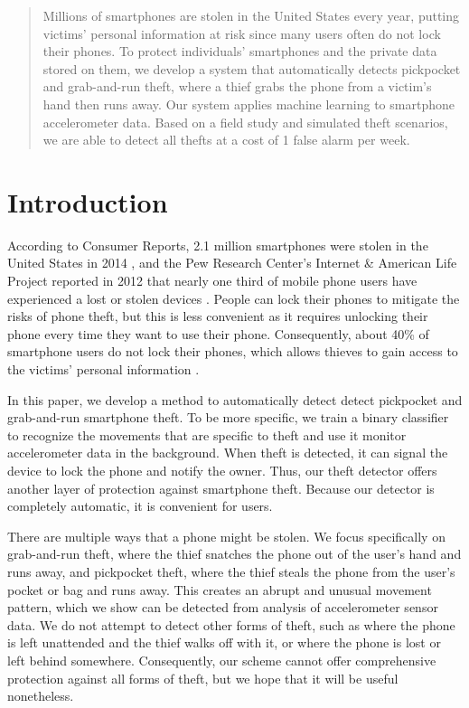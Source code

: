 \documentclass{soups}
\begin{document}
\maketitle
\begin{abstract}
Millions of smartphones are stolen in the United States every year, putting victims' personal information at risk since many users often do not lock their phones. To protect individuals' smartphones and the private data stored on them, we develop a system that automatically detects pickpocket and grab-and-run theft, where a thief grabs the phone from a victim's hand then runs away. Our system applies machine learning to smartphone accelerometer data. Based on a field study and simulated theft scenarios, we are able to detect all thefts at a cost of 1 false alarm per week.
\end{abstract}




\section{Introduction}
According to Consumer Reports, 2.1 million smartphones were stolen in the United States in 2014 \cite{deitrick:consumer}, and the Pew Research Center's Internet \& American Life Project reported in 2012 that nearly one third of mobile phone users have experienced a lost or stolen devices \cite{boyles:pew}.
People can lock their phones to mitigate the risks of phone theft, but this is less convenient as it requires unlocking their phone every time they want to use their phone.
Consequently, about 40\% of smartphone users do not lock their phones, which allows thieves to gain access to the victims' personal information \cite{egelman:lock}.

In this paper, we develop a method to automatically detect detect pickpocket and grab-and-run smartphone theft. To be more specific, we train a binary classifier to recognize the movements that are specific to theft and use it monitor accelerometer data in the background.
When theft is detected, it can signal the device to lock the phone and notify the owner. Thus, our theft detector offers another layer of protection against smartphone theft.
Because our detector is completely automatic, it is convenient for users.

There are multiple ways that a phone might be stolen.
We focus specifically on grab-and-run theft, where the thief snatches the phone out of the user's hand and runs away, and pickpocket theft, where the thief steals the phone from the user's pocket or bag and runs away.
This creates an abrupt and unusual movement pattern, which we show can be detected from analysis of accelerometer sensor data.
We do not attempt to detect other forms of theft, such as where the phone is left unattended and the thief walks off with it, or where the phone is lost or left behind somewhere.
Consequently, our scheme cannot offer comprehensive protection against all forms of theft, but we hope that it will be useful nonetheless.
\end{document}
